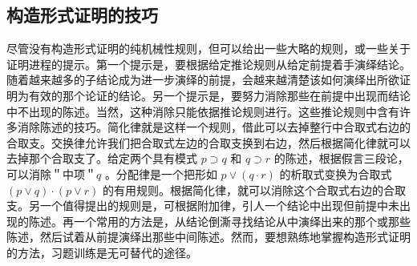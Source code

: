 \subsection{构造形式证明的技巧}

尽管没有构造形式证明的纯机械性规则，但可以给出一些大略的规则，或一些关于证明进程的提示。第一个提示是，要根据给定推论规则从给定前提着手演绎结论。随着越来越多的子结论成为进一步演绎的前提，会越来越清楚该如何演绎出所欲证明为有效的那个论证的结论。另一个提示是，要努力消除那些在前提中出现而结论中不出现的陈述。当然，这种消除只能依据推论规则进行。这些推论规则中含有许多消除陈述的技巧。简化律就是这样一个规则，借此可以去掉整行中合取式右边的合取支。交换律允许我们把合取式左边的合取支换到右边，然后根据简化律就可以去掉那个合取支了。给定两个具有模式 $p \supset q$ 和 $q \supset r$ 的陈述，根据假言三段论，可以消除＂中项＂$q$ 。分配律是一个把形如 $p \vee(q \cdot r)$ 的析取式变换为合取式 $(p \vee q) \cdot(p \vee r)$ 的有用规则。根据简化律，就可以消除这个合取式右边的合取支。另一个值得提出的规则是，可根据附加律，引人一个结论中出现但前提中未出现的陈述。再一个常用的方法是，从结论倒澌寻找结论从中演绎出来的那个或那些陈述，然后试着从前提演绎出那些中间陈述。然而，要想熟练地掌握构造形式证明的方法，习题训练是无可替代的途径。

\begin{center}
\end{center} 

